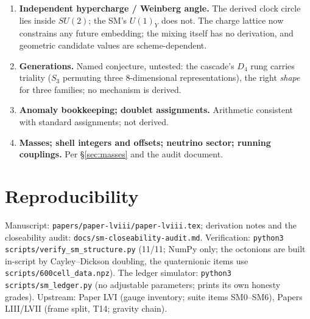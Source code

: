 \documentclass[12pt]{article}
\theoremstyle{definition}
\theoremstyle{remark}
\begin{document}
\begin{enumerate}
\item \textbf{Independent hypercharge / Weinberg angle.} The derived clock circle lies inside $SU(2)$; the SM's $U(1)_Y$ does not. The charge lattice now constrains any future embedding; the mixing itself has no derivation, and geometric candidate values are scheme-dependent.
\item \textbf{Generations.} Named conjecture, untested: the cascade's $D_4$ rung carries triality ($S_3$ permuting three 8-dimensional representations), the right \emph{shape} for three families; no mechanism is derived.
\item \textbf{Anomaly bookkeeping; doublet assignments.} Arithmetic consistent with standard assignments; not derived.
\item \textbf{Masses; shell integers and offsets; neutrino sector; running couplings.} Per \S\ref{sec:masses} and the audit document.
\end{enumerate}

\section{Reproducibility}\label{sec:repro}

Manuscript: \texttt{papers/paper-lviii/paper-lviii.tex}; derivation notes and the closeability audit: \texttt{docs/sm-closeability-audit.md}. Verification: \texttt{python3 scripts/verify\_sm\_structure.py} (11/11; NumPy only; the octonions are built in-script by Cayley--Dickson doubling, the quaternionic items use \texttt{scripts/600cell\_data.npz}). The ledger simulator: \texttt{python3 scripts/sm\_ledger.py} (no adjustable parameters; prints its own honesty grades). Upstream: Paper LVI (gauge inventory; suite items SM0--SM6), Papers LIII/LVII (frame split, T14; gravity chain).



\end{document}
